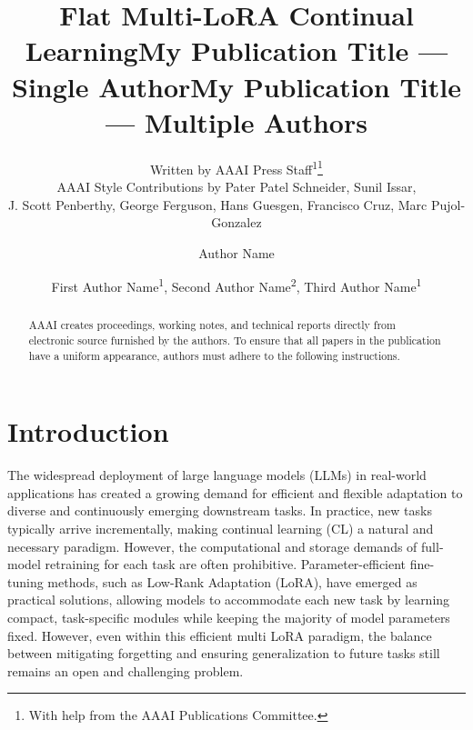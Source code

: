 \documentclass[letterpaper]{article} %
\title{Flat Multi-LoRA Continual Learning}
\author{
    Written by AAAI Press Staff\textsuperscript{\rm 1}\thanks{With help from the AAAI Publications Committee.}\\
    AAAI Style Contributions by Pater Patel Schneider,
    Sunil Issar,\\
    J. Scott Penberthy,
    George Ferguson,
    Hans Guesgen,
    Francisco Cruz\equalcontrib,
    Marc Pujol-Gonzalez\equalcontrib
}
\title{My Publication Title --- Single Author}
\author {
    Author Name
}
\title{My Publication Title --- Multiple Authors}
\author {
    First Author Name\textsuperscript{\rm 1},
    Second Author Name\textsuperscript{\rm 2},
    Third Author Name\textsuperscript{\rm 1}
}
\begin{document}
\maketitle

\begin{abstract}
AAAI creates proceedings, working notes, and technical reports directly from electronic source furnished by the authors. To ensure that all papers in the publication have a uniform appearance, authors must adhere to the following instructions.
\end{abstract}


\section{Introduction}

The widespread deployment of large language models (LLMs) in real-world applications has created a growing demand for efficient and flexible adaptation to diverse and continuously emerging downstream tasks. In practice, new tasks typically arrive incrementally, making continual learning (CL) a natural and necessary paradigm. However, the computational and storage demands of full-model retraining for each task are often prohibitive. Parameter-efficient fine-tuning methods, such as Low-Rank Adaptation (LoRA), have emerged as practical solutions, allowing models to accommodate each new task by learning compact, task-specific modules while keeping the majority of model parameters fixed. However, even within this efficient multi LoRA paradigm, the balance between mitigating forgetting and ensuring generalization to future tasks still remains an open and challenging problem.
\end{document}
